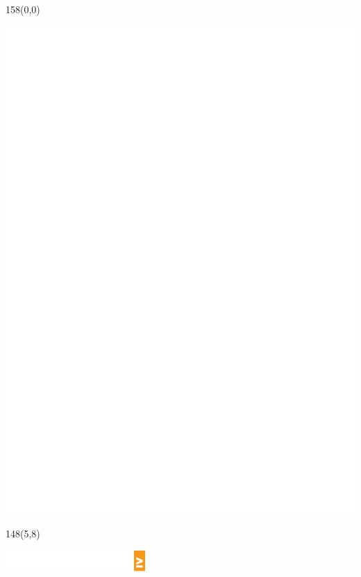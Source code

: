 \documentclass{extarticle}
\begin{document}
\pagecolor{black}
\pagestyle{empty}

\begin{textblock}{158}(0,0)
\vfill
{\centerline{\includegraphics[scale=1,]{tools/images/notebook-background-marks.pdf}}} 
\vfill
\end{textblock}


\begin{textblock}{148}(5,8)
\vfill
{\centerline{\includegraphics[height=8mm,]{tools/images/blok-navic-4.pdf}}}
\vfill
\end{textblock}
\end{document}
